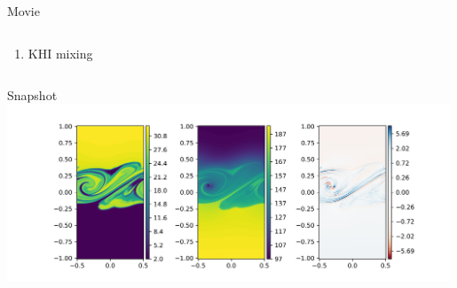 \documentclass[10pt,aspectratio=169,usenames,dvipsnames]{beamer}
\begin{document}


\begin{frame}{Movie}
\begin{columns}
\begin{column}{0.5\textwidth}
\begin{enumerate}
\item KHI mixing
\end{enumerate}
\end{column}
\begin{column}{0.5\textwidth}

\end{column}
\end{columns}
\end{frame}

\begin{frame}{Snapshot}
\includegraphics[width=0.99\textwidth]{2023Mixing/Figures/KHInlev_testplot2.png}
\end{frame}
\end{document}
